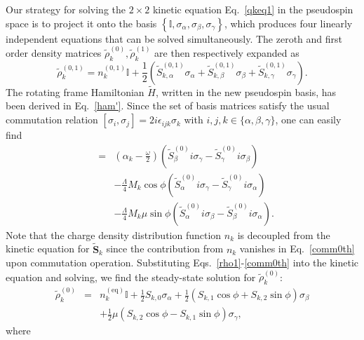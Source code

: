 \documentclass[reprint,amsmath,amssymb,aps,prb]{revtex4-1}
\begin{document}
Our strategy for solving the $2\times 2$ kinetic equation Eq.~\eqref{qkeq1} in the pseudospin space is to project it onto the basis  $\left\{\mathbb{I},\sigma_\alpha,\sigma_\beta,\sigma_\gamma\right\}$,
which produces four linearly independent equations that can be solved simultaneously.  The zeroth and first order density matrices $\tilde{\rho}_k^{(0)}, \tilde{\rho}_k^{(1)}$ are then respectively expanded as
%
\begin{equation}
  \tilde{\rho}_k^{(0,1)}=n_k^{(0,1)}\mathbb{I}+\frac{1}{2}\left(\tilde{S}_{k,\alpha}^{(0,1)}\sigma_\alpha +\tilde{S}_{k,\beta}^{(0,1)}\sigma_\beta+\tilde{S}_{k,\gamma}^{(0,1)}\sigma_\gamma\right). \label{rho1}
\end{equation}
%
The rotating frame Hamiltonian $\tilde{H}$, written in the new pseudospin basis, has been derived in Eq.~\eqref{ham'}. Since the set of basis matrices satisfy the usual  commutation relation $[\sigma_i,\sigma_j]=2i\epsilon_{ijk}\sigma_k$ with $i,j,k \in \{\alpha, \beta,\gamma\}$, one can easily find   
%
\begin{eqnarray}
[\tilde{H}, \tilde{\rho}_k^{(0)}]&=&\left(\alpha_k-\frac{\omega}{2}\right)(\tilde{S}_\beta^{(0)}i\sigma_\gamma - \tilde{S}_\gamma^{(0)}i\sigma_\beta) \label{comm0th}\\
&&-\frac{\Lambda}{4}M_k\cos\phi (\tilde{S}_\alpha^{(0)}i\sigma_\gamma-\tilde{S}_\gamma^{(0)}i\sigma_\alpha) \nonumber \\
&&-\frac{\Lambda}{4}M_k\mu\sin\phi (\tilde{S}_\alpha^{(0)}i\sigma_\beta-\tilde{S}_\beta^{(0)}i\sigma_\alpha). \nonumber
\end{eqnarray}
%
Note that the charge density distribution function $n_k$ is decoupled from the kinetic equation for $\tilde{\bm{S}}_k$ since the contribution from $n_k$ vanishes in Eq.~\eqref{comm0th}  upon commutation operation. Substituting Eqs.~\eqref{rho1}-\eqref{comm0th} into the kinetic equation and solving, 
we find the steady-state solution for 
$\tilde{\rho}_k^{(0)}$:
%
\begin{eqnarray}
\tilde{\rho}_k^{(0)} &=& n_k^{(\mathrm{eq})}\mathbb{I} + \frac{1}{2}S_{k,0}\sigma_\alpha+\frac{1}{2}(S_{k,1}\cos\phi+S_{k,2}\sin\phi)\sigma_\beta \nonumber \\
&&+\frac{1}{2}\mu(S_{k,2}\cos\phi-S_{k,1}\sin\phi)\sigma_\gamma, \label{rho0Sol}
\end{eqnarray}
%
where
%
\end{document}

